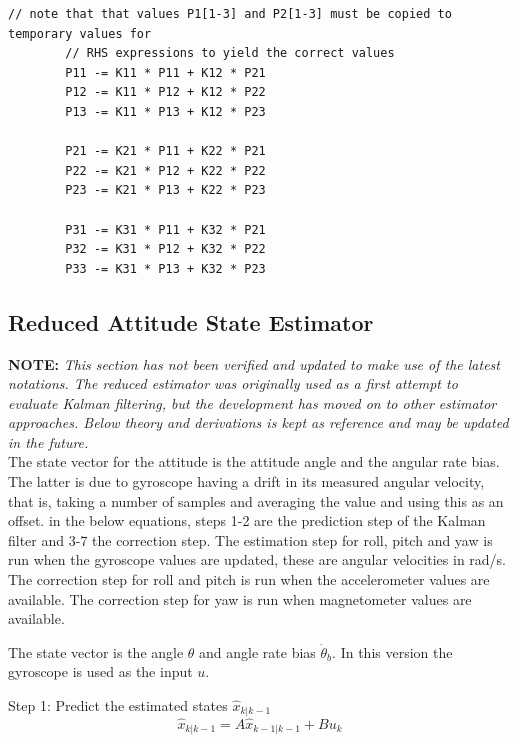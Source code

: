 \documentclass[a4paper]{report}
\begin{document}
		\begin{lstlisting}[frame=single, caption={Correct state estimate pseudo code}, label={pseudo:correct-error-covariance-3v}]
		// note that that values P1[1-3] and P2[1-3] must be copied to temporary values for
		// RHS expressions to yield the correct values
		P11 -= K11 * P11 + K12 * P21
		P12 -= K11 * P12 + K12 * P22
		P13 -= K11 * P13 + K12 * P23

		P21 -= K21 * P11 + K22 * P21
		P22 -= K21 * P12 + K22 * P22
		P23 -= K21 * P13 + K22 * P23

		P31 -= K31 * P11 + K32 * P21
		P32 -= K31 * P12 + K32 * P22
		P33 -= K31 * P13 + K32 * P23
		\end{lstlisting}

\subsection{Reduced Attitude State Estimator}

\textbf{NOTE:} \emph{This section has not been verified and updated to make use of the latest notations. The reduced estimator was originally used as a first attempt to evaluate Kalman filtering, but the development has moved on to other estimator approaches. Below theory and derivations is kept as reference and may be updated in the future.} \\

The state vector for the attitude is the attitude angle and the angular rate bias. The latter is due to gyroscope having a drift in its measured angular velocity, that is, taking a number of samples and averaging the value and using this as an offset. in the below equations, steps 1-2 are the prediction step of the Kalman filter and 3-7 the correction step. The estimation step for roll, pitch and yaw is run when the gyroscope values  are updated, these are angular velocities in rad/s. The correction step for roll and pitch is run when the accelerometer values are available. The correction step for yaw is run when magnetometer values are available.
	
	The state vector is the angle $\theta$  and angle rate bias $\dot{\theta}_b$. In this version the gyroscope is used as the input $u$.

		Step 1: Predict the estimated states $\hat{x}_{k|k-1}$
		\begin{equation}
		\label{eq:state-equation-2v}
		\hat{x}_{k|k-1}=A\hat{x}_{k-1|k-1}+Bu_{k}
		\end{equation}
\end{document}
